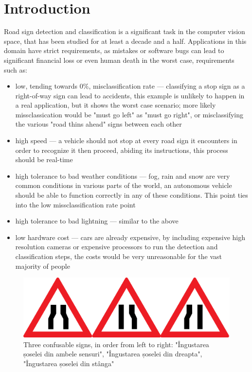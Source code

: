 \documentclass[conference]{IEEEtran}
\begin{document}
\section{Introduction}
Road sign detection and classification is a significant task in the computer vision space, that
has been studied for at least a decade and a half. Applications in this domain have strict requirements,
as mistakes or software bugs can lead to significant financial loss or even human death in the worst case,
requirements such as:
\begin{itemize}
    \item low, tending towards 0\%, misclassification rate --- classifying a stop sign as a right-of-way
    sign can lead to accidents, this example is unlikely to happen in a real application, but it shows
    the worst case scenario; more likely missclassication would be "must go left" as "must go right", or
    misclassifying the various "road thins ahead" signs between each other
    \item high speed --- a vehicle should not stop at every road sign it encounters in order to recognize it
    then proceed, abiding its instructions, this process should be real-time
    \item high tolerance to bad weather conditions --- fog, rain and snow are very common conditions in
    various parts of the world, an autonomous vehicle should be able to function correctly in any of these
    conditions. This point ties into the low missclassification rate point
    \item high tolerance to bad lightning --- similar to the above
    \item low hardware cost --- cars are already expensive, by including expensive high resolution cameras
    or expensive processors to run the detection and classification steps, the costs would be very unreasonable
    for the vast majority of people
\end{itemize}

\begin{figure}
    \centerline{\includegraphics[width=\linewidth]{confusables}}
    \caption{Three confusable signs, in order from left to right: "Îngustarea șoselei din ambele sensuri",
    "Îngustarea șoselei din dreapta", "Îngustarea șoselei din stânga"\protect\footnotemark}
\end{figure}
\end{document}
